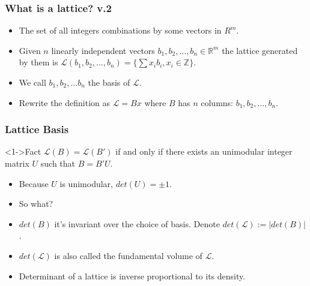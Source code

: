 \documentclass{beamer}
\begin{document}
% 
\begin{frame}
    \frametitle{What is a lattice? v.2}
    \begin{itemize}
        \item The set of all integers combinations by some vectors in $R^m$.
        \item Given $n$ linearly independent vectors $b_1, b_2, \dots, b_n \in \mathbb{R}^m$ the lattice generated by them is $\mathcal{L}(b_1, b_2, \dots, b_n) = \{ \sum\nolimits{}{x_ib_i} , x_i \in \mathbb{Z}\}$.
        \item We call $b_1, b_2, \dots b_n$ the basis of $\mathcal{L}$.
        \item Rewrite the definition as $\mathcal{L} = Bx$ where $B$ has $n$ columns: $b_1, b_2, \dots, b_n$.

    \end{itemize}
\end{frame}

\begin{frame}
    \frametitle{Lattice Basis}
    \begin{block}<1->{Fact}
        $\mathcal{L}(B) = \mathcal{L}(B')$ if and only if there exists an unimodular integer matrix $U$ such that $B = B'U$.
    \end{block} 
    \begin{itemize}
        \pause \item Because $U$ is unimodular, $det(U) = \pm 1$.
        \pause \item So what?
        \pause \item $det(B)$ it's invariant over the choice of basis. Denote $det(\mathcal{L}) := |det(B)|$.
        \pause \item $det(\mathcal{L})$ is also called the fundamental volume of $\mathcal{L}$.
        \pause \item Determinant of a lattice is inverse proportional to its density.
    \end{itemize}
\end{frame}
\end{document}
